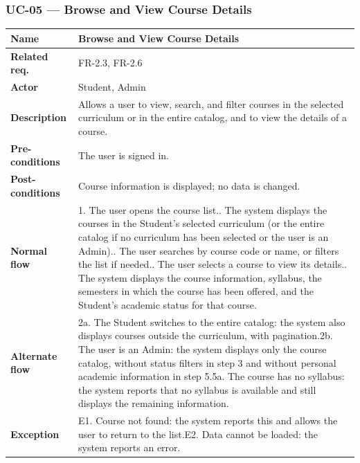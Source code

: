 \subsubsection{UC-05 --- Browse and View Course Details}
\begin{longtable}{|p{}|p{}|}
\hline
\textbf{Name} & Browse and View Course Details \\
\hline
\textbf{Related req.} & FR-2.3, FR-2.6 \\
\hline
\textbf{Actor} & Student, Admin \\
\hline
\textbf{Description} & Allows a user to view, search, and filter courses in the selected curriculum or in the entire catalog, and to view the details of a course. \\
\hline
\textbf{Pre-conditions} & The user is signed in. \\
\hline
\textbf{Post-conditions} & Course information is displayed; no data is changed. \\
\hline
\textbf{Normal flow} & 1. The user opens the course list.\newline 2. The system displays the courses in the Student's selected curriculum (or the entire catalog if no curriculum has been selected or the user is an Admin).\newline 3. The user searches by course code or name, or filters the list if needed.\newline 4. The user selects a course to view its details.\newline 5. The system displays the course information, syllabus, the semesters in which the course has been offered, and the Student's academic status for that course. \\
\hline
\textbf{Alternate flow} & 2a. The Student switches to the entire catalog: the system also displays courses outside the curriculum, with pagination.\newline 2b. The user is an Admin: the system displays only the course catalog, without status filters in step 3 and without personal academic information in step 5.\newline 5a. The course has no syllabus: the system reports that no syllabus is available and still displays the remaining information. \\
\hline
\textbf{Exception} & E1. Course not found: the system reports this and allows the user to return to the list.\newline E2. Data cannot be loaded: the system reports an error. \\
\hline
\end{longtable}


